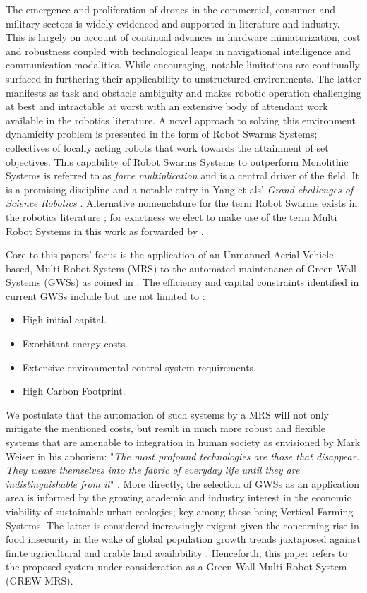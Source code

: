 \documentclass{report}
\begin{document}
The emergence and proliferation of drones in the commercial, consumer and military sectors is widely evidenced and supported in literature and industry. This is largely on account of continual advances in hardware miniaturization, cost and robustness coupled with technological leaps in navigational intelligence and communication modalities. While encouraging, notable limitations are continually surfaced in furthering their applicability to unstructured environments. The latter manifests as task and obstacle ambiguity and makes robotic operation challenging at best and intractable at worst with an extensive body of attendant work available in the robotics literature. A novel approach to solving this environment dynamicity problem is presented in the form of Robot Swarms Systems; collectives of locally acting robots that work towards the attainment of set objectives. This capability of Robot Swarms Systems to outperform Monolithic Systems is referred to as \textit{force multiplication} \cite{Yang2018} and is a central driver of the field. It is a promising discipline and a notable entry in Yang et als' \textit{Grand challenges of Science Robotics} \cite{Yang2018}. Alternative nomenclature for the term Robot Swarms exists in the robotics literature \cite{Beni2005a} \cite{Sahin2005} \cite{Iocchi2001}; for exactness we elect to make use of the term Multi Robot Systems in this work as forwarded by \cite{Iocchi2001}.

Core to this papers' focus is the application of an Unmanned Aerial Vehicle-based, Multi Robot System (MRS) to the automated maintenance of Green Wall Systems (GWSs) as coined in \cite{Perini2011}. The efficiency and capital constraints identified in current GWSs include but are not limited to \cite{Holt2018}:
\begin{itemize}
	\item High initial capital.
	\item Exorbitant energy costs.
	\item Extensive environmental control system requirements.
	\item High Carbon Footprint.
\end{itemize}

We postulate that the automation of such systems by a MRS will not only mitigate the mentioned costs, but result in much more robust and flexible systems that are amenable to integration in human society as envisioned by Mark Weiser in his aphorism: "\textit{The most profound technologies are those that disappear. They weave themselves into the fabric of everyday life until they are indistinguishable from it}" \cite{Weiser2002}. More directly, the selection of GWSs as an application area is informed by the growing academic \cite{Manso2015} \cite{Graamans2018} \cite{Neil2017} and industry \cite{Gmi2017} \cite{Holt2018} interest in the economic viability of sustainable urban ecologies; key among these being Vertical Farming Systems. The latter is considered increasingly exigent given the concerning rise in food insecurity \cite{Yang2018} in the wake of global population growth trends juxtaposed against finite agricultural and arable land availability \cite{Banerjee2014}. Henceforth, this paper refers to the proposed system under consideration as a Green Wall Multi Robot System (GREW-MRS).
\end{document}

